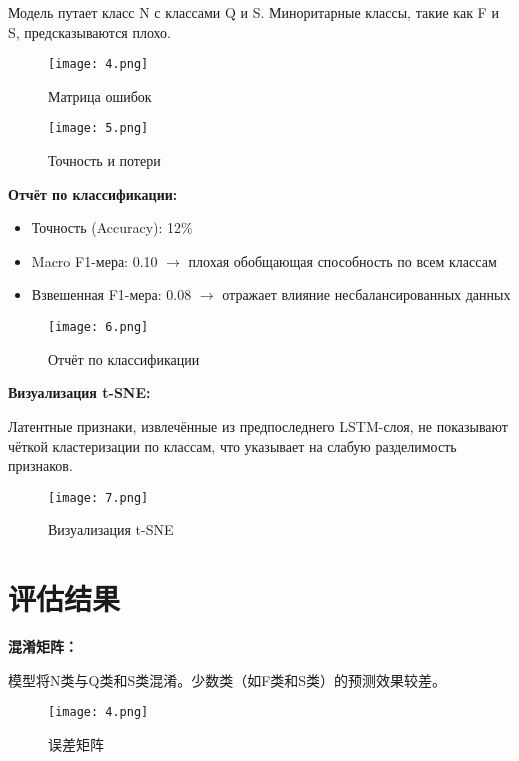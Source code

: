 \documentclass{article}
\providecommand{\pcsync}{\par\vspace{\baselineskip}}
\begin{document}
\begin{paracol}{2}
Модель путает класс N с классами Q и S. Миноритарные классы, такие как F и S, предсказываются плохо.

\begin{figure}[H]
    \centering
    \texttt{[image: 4.png]}
    \caption{Матрица ошибок}
    \label{fig:enter-label}
\end{figure}

\begin{figure}[H]
    \centering
    \texttt{[image: 5.png]}
    \caption{Точность и потери}
    \label{fig:enter-label}
\end{figure}

\textbf{Отчёт по классификации:}
\begin{itemize}
    \item Точность (Accuracy): 12\%
    \item Macro F1-мера: 0.10 $\rightarrow$ плохая обобщающая способность по всем классам
    \item Взвешенная F1-мера: 0.08 $\rightarrow$ отражает влияние несбалансированных данных
\end{itemize}

\begin{figure}[H]
    \centering
    \texttt{[image: 6.png]}
    \caption{Отчёт по классификации}
    \label{fig:enter-label}
\end{figure}

\textbf{Визуализация t-SNE:}

Латентные признаки, извлечённые из предпоследнего LSTM-слоя, не показывают чёткой кластеризации по классам, что указывает на слабую разделимость признаков.

\begin{figure}[H]
    \centering
    \texttt{[image: 7.png]}
    \caption{Визуализация t-SNE}
    \label{fig:enter-label}
\end{figure}

\switchcolumn

\section{评估结果}
\pcsync
\textbf{混淆矩阵：}

模型将N类与Q类和S类混淆。少数类（如F类和S类）的预测效果较差。

\begin{figure}[H]
    \centering
    \texttt{[image: 4.png]}
    \caption{误差矩阵}
    \label{fig:enter-label}
\end{figure}


\end{paracol}
\end{document}
